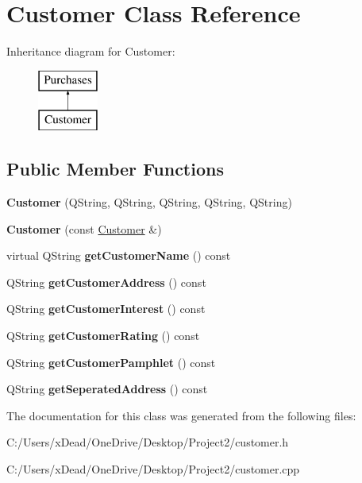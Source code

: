 \hypertarget{class_customer}{}\section{Customer Class Reference}
\label{class_customer}
Inheritance diagram for Customer\+:\begin{figure}[H]
\begin{center}
\leavevmode
\includegraphics[height=2.000000cm]{class_customer}
\end{center}
\end{figure}
\subsection*{Public Member Functions}
\begin{DoxyCompactItemize}
\item 
\mbox{\label{class_customer_aadd2561680381af9de9d3b9abdc54bb8}} 
{\bfseries Customer} (Q\+String, Q\+String, Q\+String, Q\+String, Q\+String)
\item 
\mbox{\label{class_customer_a551c3a7139081bc840501bc06c796e96}} 
{\bfseries Customer} (const \mbox{\hyperlink{class_customer}{Customer}} \&)
\item 
\mbox{\label{class_customer_a65bcde40edff711f6a96847f4720e83e}} 
virtual Q\+String {\bfseries get\+Customer\+Name} () const
\item 
\mbox{\label{class_customer_a11886fba33594f13559f1ddd801cbe4c}} 
Q\+String {\bfseries get\+Customer\+Address} () const
\item 
\mbox{\label{class_customer_a6847c0af28a15a96345205d8cd87bf8c}} 
Q\+String {\bfseries get\+Customer\+Interest} () const
\item 
\mbox{\label{class_customer_a60e7fe5a6c74f4aca05bdf836b1b1c5f}} 
Q\+String {\bfseries get\+Customer\+Rating} () const
\item 
\mbox{\label{class_customer_ab74ea75c93b6ff556326d106f03237c8}} 
Q\+String {\bfseries get\+Customer\+Pamphlet} () const
\item 
\mbox{\label{class_customer_a0c41e82116af74a6e49687b8f163a42e}} 
Q\+String {\bfseries get\+Seperated\+Address} () const
\end{DoxyCompactItemize}


The documentation for this class was generated from the following files\+:\begin{DoxyCompactItemize}
\item 
C\+:/\+Users/x\+Dead/\+One\+Drive/\+Desktop/\+Project2/customer.\+h\item 
C\+:/\+Users/x\+Dead/\+One\+Drive/\+Desktop/\+Project2/customer.\+cpp\end{DoxyCompactItemize}
